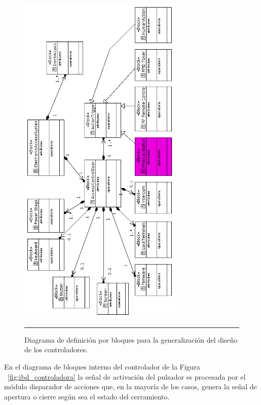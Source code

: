 \begin{figure}[htbp]
	\centering
	\includegraphics[width=0.7\textwidth]{Pictures/controller_bdd_baw_gimp.png}
	\rule{35em}{1pt}
	\caption[Diagrama Bloques Controlador]{Diagrama de definición por bloques para la generalización del diseño de los controladores.}
	\label{fig:controller_bdd}
\end{figure}
En el diagrama de bloques interno del controlador de la Figura ~\ref{fig:ibd_controladora} la señal de activación del pulsador es procesada por el módulo disparador de acciones que, en la mayoría de los casos, genera la señal de apertura o cierre según sea el estado del cerramiento.\\
